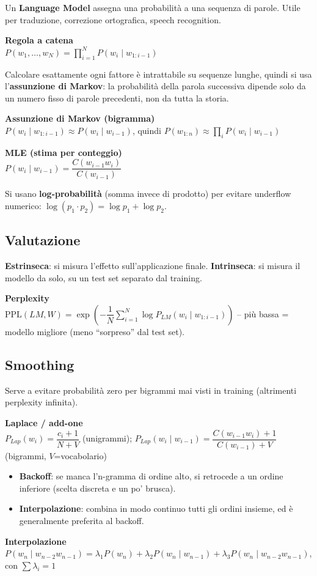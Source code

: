 \documentclass[11pt,a4paper]{article}
\newcommand{\formula}[2]{\begin{formulabox}\textbf{#1}\\[3pt]#2\end{formulabox}}
\begin{document}
Un \textbf{Language Model} assegna una probabilit\`a a una sequenza di parole. Utile per traduzione, correzione ortografica, speech recognition.

\formula{Regola a catena}{$P(w_1,\ldots,w_N) = \prod_{i=1}^{N} P(w_i \mid w_{1:i-1})$}

Calcolare esattamente ogni fattore \`e intrattabile su sequenze lunghe, quindi si usa l'\textbf{assunzione di Markov}: la probabilit\`a della parola successiva dipende solo da un numero fisso di parole precedenti, non da tutta la storia.

\formula{Assunzione di Markov (bigramma)}{$P(w_i \mid w_{1:i-1}) \approx P(w_i \mid w_{i-1})$, quindi $P(w_{1:n}) \approx \prod_i P(w_i\mid w_{i-1})$}
\formula{MLE (stima per conteggio)}{$P(w_i \mid w_{i-1}) = \dfrac{C(w_{i-1}w_i)}{C(w_{i-1})}$}

Si usano \textbf{log-probabilit\`a} (somma invece di prodotto) per evitare underflow numerico: $\log(p_1\cdot p_2)=\log p_1+\log p_2$.

\subsection*{Valutazione}
\textbf{Estrinseca}: si misura l'effetto sull'applicazione finale. \textbf{Intrinseca}: si misura il modello da solo, su un test set separato dal training.

\formula{Perplexity}{$\mathrm{PPL}(LM,W) = \exp\left(-\dfrac{1}{N}\sum_{i=1}^N \log P_{LM}(w_i\mid w_{1:i-1})\right)$ -- pi\`u bassa = modello migliore (meno ``sorpreso'' dal test set).}

\subsection*{Smoothing}
Serve a evitare probabilit\`a zero per bigrammi mai visti in training (altrimenti perplexity infinita).
\formula{Laplace / add-one}{$P_{Lap}(w_i) = \dfrac{c_i+1}{N+V}$ \quad(unigrammi); \quad $P_{Lap}(w_i\mid w_{i-1}) = \dfrac{C(w_{i-1}w_i)+1}{C(w_{i-1})+V}$ \quad(bigrammi, $V$=vocabolario)}

\begin{itemize}
  \item \textbf{Backoff}: se manca l'n-gramma di ordine alto, si retrocede a un ordine inferiore (scelta discreta e un po' brusca).
  \item \textbf{Interpolazione}: combina in modo continuo tutti gli ordini insieme, ed \`e generalmente preferita al backoff.
\end{itemize}
\formula{Interpolazione}{$P(w_n\mid w_{n-2}w_{n-1}) = \lambda_1 P(w_n) + \lambda_2 P(w_n\mid w_{n-1}) + \lambda_3 P(w_n\mid w_{n-2}w_{n-1})$, con $\sum\lambda_i=1$}
\end{document}
